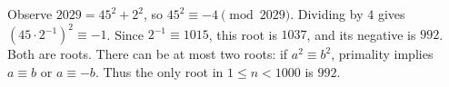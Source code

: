 Observe $2029=45^2+2^2$, so $45^2\equiv-4\pmod{2029}$. Dividing by $4$ gives $\left(45\cdot2^{-1}\right)^2\equiv-1$. Since $2^{-1}\equiv1015$, this root is $1037$, and its negative is $992$. Both are roots. There can be at most two roots: if $a^2\equiv b^2$, primality implies $a\equiv b$ or $a\equiv-b$. Thus the only root in $1\le n<1000$ is $\boxed{992}$.
